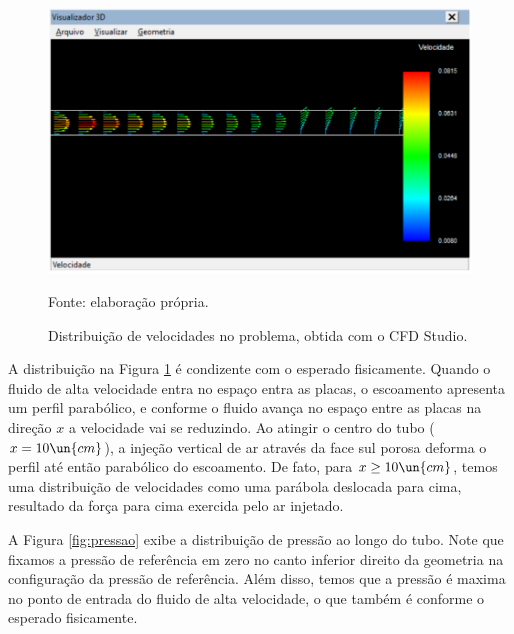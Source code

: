 \begin{figure}[h!]
    \caption{Distribuição de velocidades no problema, obtida com o CFD Studio.}
    \label{fig:velocidades}
    \centering
    \centerline{\includegraphics[scale=0.45]{velocidades.png}}
    \par{Fonte: elaboração própria.}
\end{figure}

A distribuição na Figura \ref*{fig:velocidades} é condizente com o esperado fisicamente. Quando 
o fluido de alta velocidade entra no espaço entra as placas, o escoamento apresenta um perfil
parabólico, e conforme o fluido avança no espaço entre as placas na direção $x$ a 
velocidade vai se reduzindo. Ao atingir o centro do tubo ($x = 10 \un{cm}$), a injeção
vertical de ar através da face sul porosa deforma o perfil até então parabólico do escoamento.
De fato, para $x \geq 10 \un{cm}$, temos uma distribuição de velocidades como uma parábola deslocada
para cima, resultado da força para cima exercida pelo ar injetado.

A Figura \ref*{fig:pressao} exibe a distribuição de pressão ao longo do tubo. Note que fixamos a pressão de referência 
em zero no canto inferior direito da geometria na configuração da pressão de referência.
Além disso, temos que a pressão é maxima no ponto de entrada do fluido de alta velocidade,
o que também é conforme o esperado fisicamente.

